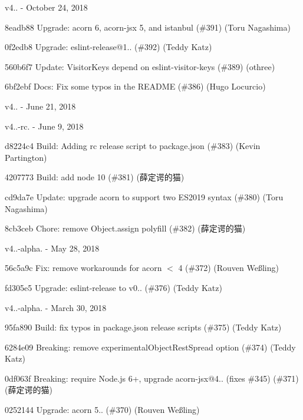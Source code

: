 v4.. -\/ October 24, 2018


\begin{DoxyItemize}
\item 8eadb88 Upgrade\+: acorn 6, acorn-\/jsx 5, and istanbul (\#391) (Toru Nagashima)
\item 0f2edb8 Upgrade\+: eslint-\/release@1.. (\#392) (Teddy Katz)
\item 560b6f7 Update\+: Visitor\+Keys depend on eslint-\/visitor-\/keys (\#389) (othree)
\item 6bf2ebf Docs\+: Fix some typos in the README (\#386) (Hugo Locurcio)
\end{DoxyItemize}

v4.. -\/ June 21, 2018

v4..-\/rc. -\/ June 9, 2018


\begin{DoxyItemize}
\item d8224c4 Build\+: Adding rc release script to package.\+json (\#383) (Kevin Partington)
\item 4207773 Build\+: add node 10 (\#381) (薛定谔的猫)
\item cd9da7e Update\+: upgrade acorn to support two ES2019 syntax (\#380) (Toru Nagashima)
\item 8cb3ceb Chore\+: remove Object.\+assign polyfill (\#382) (薛定谔的猫)
\end{DoxyItemize}

v4..-\/alpha. -\/ May 28, 2018


\begin{DoxyItemize}
\item 56c5a9c Fix\+: remove workarounds for acorn \texorpdfstring{$<$}{<} 4 (\#372) (Rouven Weßling)
\item fd305e5 Upgrade\+: eslint-\/release to v0.. (\#376) (Teddy Katz)
\end{DoxyItemize}

v4..-\/alpha. -\/ March 30, 2018


\begin{DoxyItemize}
\item 95fa890 Build\+: fix typos in package.\+json release scripts (\#375) (Teddy Katz)
\item 6284e09 Breaking\+: remove experimental\+Object\+Rest\+Spread option (\#374) (Teddy Katz)
\item 0df063f Breaking\+: require Node.\+js 6+, upgrade acorn-\/jsx@4.. (fixes \#345) (\#371) (薛定谔的猫)
\item 0252144 Upgrade\+: acorn 5.. (\#370) (Rouven Weßling)
\end{DoxyItemize}


